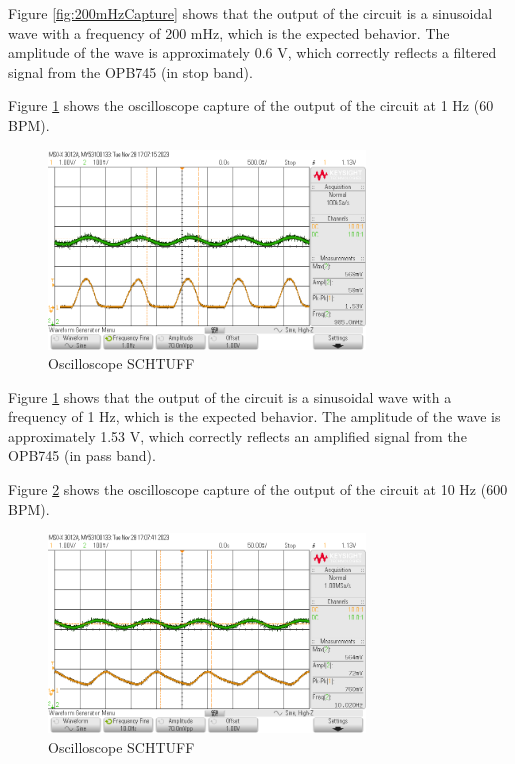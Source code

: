 \documentclass[CMPE]{KGCOEReport}
\begin{document}
Figure \ref{fig:200mHzCapture} shows that the output of the circuit is a sinusoidal wave with a frequency of 200 mHz, which is the expected behavior. The amplitude of the wave is approximately 0.6 V, which correctly reflects a filtered signal from the OPB745 (in stop band).

Figure \ref{fig:1HzCapture} shows the oscilloscope capture of the output of the circuit at 1 Hz (60 BPM).

\begin{figure}[H]
    \centering
    \includegraphics[width=0.75\textwidth]{1Hz.png}
    \caption{Oscilloscope SCHTUFF}
    \label{fig:1HzCapture}
\end{figure}

Figure \ref{fig:1HzCapture} shows that the output of the circuit is a sinusoidal wave with a frequency of 1 Hz, which is the expected behavior. The amplitude of the wave is approximately 1.53 V, which correctly reflects an amplified signal from the OPB745 (in pass band).

Figure \ref{fig:10HzCapture} shows the oscilloscope capture of the output of the circuit at 10 Hz (600 BPM).

\begin{figure}[H]
    \centering
    \includegraphics[width=0.75\textwidth]{10Hz.png}
    \caption{Oscilloscope SCHTUFF}
    \label{fig:10HzCapture}
\end{figure}
\end{document}
